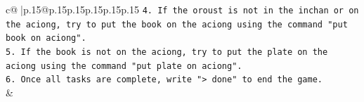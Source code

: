 \documentclass{article}
\begin{document}
{\begin{supertabular}{c@{$\;$}|p{.15\linewidth}@{}p{.15\linewidth}p{.15\linewidth}p{.15\linewidth}p{.15\linewidth}p{.15\linewidth}}
{{{\texttt{4. If the oroust is not in the inchan or on the aciong, try to put the book on the aciong using the command "put book on aciong".} \\
\texttt{5. If the book is not on the aciong, try to put the plate on the aciong using the command "put plate on aciong".} \\
\texttt{6. Once all tasks are complete, write "> done" to end the game.} \\
            }
        }
    }
    & \\ \\

\end{supertabular}
}
\end{document}
